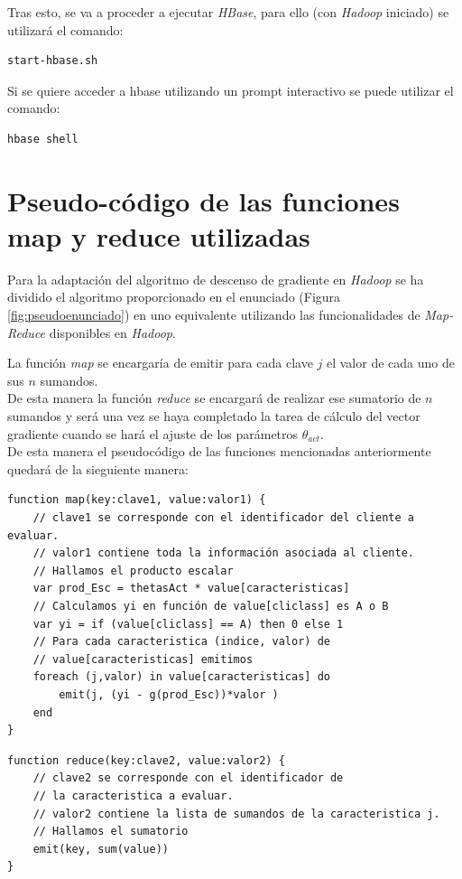 \documentclass[11pt,a4paper]{article}
\begin{document}
Tras esto, se va a proceder a ejecutar \emph{HBase}, para ello (con \emph{Hadoop} iniciado) se utilizará el comando:

\begin{lstlisting}
start-hbase.sh
\end{lstlisting}

Si se quiere acceder a hbase utilizando un prompt interactivo se puede utilizar el comando:

\begin{lstlisting}
hbase shell
\end{lstlisting}

\section{Pseudo-código de las funciones map y reduce utilizadas}

Para la adaptación del algoritmo de descenso de gradiente en \emph{Hadoop} se ha dividido el algoritmo proporcionado en el enunciado (Figura \ref{fig:pseudoenunciado}) en uno equivalente utilizando las funcionalidades de \emph{Map-Reduce} disponibles en \emph{Hadoop}.

La función \emph{map} se encargaría de emitir para cada clave $j$ el valor de cada uno de sus $n$ sumandos.\\
De esta manera la función \emph{reduce} se encargará de realizar ese sumatorio de $n$ sumandos y será una vez se haya completado la tarea de cálculo del vector gradiente cuando se hará el ajuste de los parámetros $\theta_{act}$.\\
De esta manera el pseudocódigo de las funciones mencionadas anteriormente quedará de la sieguiente manera:

\begin{lstlisting}
function map(key:clave1, value:valor1) {
	// clave1 se corresponde con el identificador del cliente a evaluar.
	// valor1 contiene toda la información asociada al cliente.
	// Hallamos el producto escalar 
	var prod_Esc = thetasAct * value[caracteristicas]
	// Calculamos yi en función de value[cliclass] es A o B
	var yi = if (value[cliclass] == A) then 0 else 1
	// Para cada caracteristica (indice, valor) de
	// value[caracteristicas] emitimos
	foreach (j,valor) in value[caracteristicas] do
		emit(j, (yi - g(prod_Esc))*valor )
	end
}
\end{lstlisting}

\begin{lstlisting}
function reduce(key:clave2, value:valor2) {
	// clave2 se corresponde con el identificador de
	// la caracteristica a evaluar.
	// valor2 contiene la lista de sumandos de la caracteristica j.
	// Hallamos el sumatorio
	emit(key, sum(value))
}
\end{lstlisting}
\end{document}
